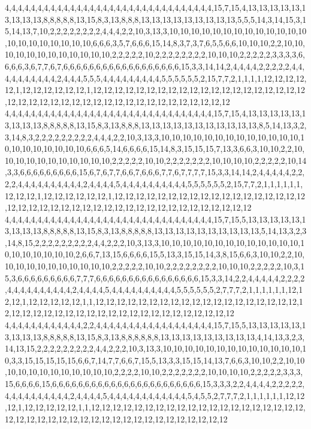 4,4,4,4,4,4,4,4,4,4,4,4,4,4,4,4,4,4,4,4,4,4,4,4,4,4,4,4,4,4,4,4,15,7,15,4,13,13,13,13,13,13,13,13,13,8,8,8,8,8,13,15,8,3,13,8,8,8,13,13,13,13,13,13,13,13,13,5,5,5,14,3,14,15,3,15,14,13,7,10,2,2,2,2,2,2,2,2,4,4,4,2,2,10,3,13,3,10,10,10,10,10,10,10,10,10,10,10,10,10,10,10,10,10,10,10,10,10,6,6,6,3,5,7,6,6,6,15,14,8,3,7,3,7,6,5,5,6,6,10,10,10,2,2,10,10,10,10,10,10,10,10,10,10,10,10,2,2,2,2,2,10,2,2,2,2,2,2,2,2,10,10,10,2,2,2,2,2,3,3,3,3,6,6,6,6,3,6,7,7,6,7,6,6,6,6,6,6,6,6,6,6,6,6,6,6,6,6,6,6,15,3,3,14,14,2,4,4,4,4,2,2,2,2,2,4,4,4,4,4,4,4,4,4,4,2,4,4,4,5,5,5,4,4,4,4,4,4,4,4,4,5,5,5,5,5,5,2,15,7,7,2,1,1,1,1,12,12,12,12,12,1,12,12,12,12,12,12,1,12,12,12,12,12,12,12,12,12,12,12,12,12,12,12,12,12,12,12,12,12,12,12,12,12,12,12,12,12,12,12,12,12,12,12,12,12,12,12,12,12
4,4,4,4,4,4,4,4,4,4,4,4,4,4,4,4,4,4,4,4,4,4,4,4,4,4,4,4,4,4,4,4,15,7,15,4,13,13,13,13,13,13,13,13,13,8,8,8,8,8,13,15,8,3,13,8,8,8,13,13,13,13,13,13,13,13,13,13,13,8,5,14,13,3,2,3,14,8,3,2,2,2,2,2,2,2,2,2,4,4,4,2,2,10,3,13,3,10,10,10,10,10,10,10,10,10,10,10,10,10,10,10,10,10,10,10,10,10,6,6,6,5,14,6,6,6,6,15,14,8,3,15,15,15,7,13,3,6,6,3,10,10,2,2,10,10,10,10,10,10,10,10,10,10,10,2,2,2,2,2,10,10,2,2,2,2,2,2,2,10,10,10,10,2,2,2,2,2,10,14,3,3,6,6,6,6,6,6,6,6,6,15,6,7,6,7,7,6,6,7,6,6,6,7,7,6,7,7,7,7,15,3,3,14,14,2,4,4,4,4,4,2,2,2,2,4,4,4,4,4,4,4,4,4,4,2,4,4,4,4,5,4,4,4,4,4,4,4,4,4,4,5,5,5,5,5,5,2,15,7,7,2,1,1,1,1,1,1,12,12,12,1,12,12,12,12,12,12,1,12,12,12,12,12,12,12,12,12,12,12,12,12,12,12,12,12,12,12,12,12,12,12,12,12,12,12,12,12,12,12,12,12,12,12,12,12,12,12,12,12
4,4,4,4,4,4,4,4,4,4,4,4,4,4,4,4,4,4,4,4,4,4,4,4,4,4,4,4,4,4,4,4,15,7,15,5,13,13,13,13,13,13,13,13,13,8,8,8,8,8,13,15,8,3,13,8,8,8,8,8,13,13,13,13,13,13,13,13,13,13,5,14,13,3,2,3,14,8,15,2,2,2,2,2,2,2,2,2,4,4,2,2,2,10,3,13,3,10,10,10,10,10,10,10,10,10,10,10,10,10,10,10,10,10,10,10,10,2,6,6,7,13,15,6,6,6,6,15,5,13,3,15,15,14,3,8,15,6,6,3,10,10,2,2,10,10,10,10,10,10,10,10,10,10,10,2,2,2,2,2,10,10,2,2,2,2,2,2,2,2,10,10,10,2,2,2,2,2,10,3,15,3,6,6,6,6,6,6,6,6,6,7,7,7,6,6,6,6,6,6,6,6,6,6,6,6,6,6,6,6,15,3,3,14,2,2,4,4,4,4,4,2,2,2,2,4,4,4,4,4,4,4,4,4,4,2,4,4,4,4,5,4,4,4,4,4,4,4,4,4,4,5,5,5,5,5,5,2,7,7,7,2,1,1,1,1,1,1,12,12,12,1,12,12,12,12,12,1,1,12,12,12,12,12,12,12,12,12,12,12,12,12,12,12,12,12,12,12,12,12,12,12,12,12,12,12,12,12,12,12,12,12,12,12,12,12,12,12,12,12
4,4,4,4,4,4,4,4,4,4,4,4,2,2,4,4,4,4,4,4,4,4,4,4,4,4,4,4,4,4,4,4,15,7,15,5,13,13,13,13,13,13,13,13,13,8,8,8,8,8,13,15,8,3,13,8,8,8,8,8,8,13,13,13,13,13,13,13,13,13,4,14,13,3,2,3,14,13,15,2,2,2,2,2,2,2,2,2,4,4,2,2,2,10,3,13,3,10,10,10,10,10,10,10,10,10,10,10,10,10,10,3,3,15,15,15,15,15,6,6,7,14,7,7,6,6,7,15,5,13,3,3,15,15,14,13,7,6,6,3,10,10,2,2,10,10,10,10,10,10,10,10,10,10,10,10,2,2,2,2,10,10,2,2,2,2,2,2,2,10,10,10,10,2,2,2,2,2,3,3,3,15,6,6,6,6,15,6,6,6,6,6,6,6,6,6,6,6,6,6,6,6,6,6,6,6,6,6,6,6,15,3,3,3,2,2,4,4,4,4,2,2,2,2,2,4,4,4,4,4,4,4,4,4,4,2,4,4,4,4,5,4,4,4,4,4,4,4,4,4,4,4,4,5,4,5,5,2,7,7,7,2,1,1,1,1,1,1,12,12,12,1,12,12,12,12,12,1,1,12,12,12,12,12,12,12,12,12,12,12,12,12,12,12,12,12,12,12,12,12,12,12,12,12,12,12,12,12,12,12,12,12,12,12,12,12,12,12,12,12
